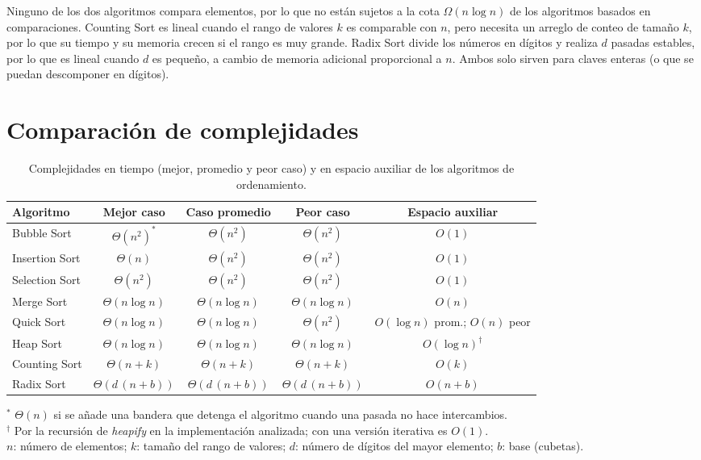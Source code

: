 \documentclass[11pt,letterpaper]{article}
\begin{document}
Ninguno de los dos algoritmos compara elementos, por lo que no están sujetos a la cota $\Omega(n \log n)$ de los algoritmos basados en comparaciones. Counting Sort es lineal cuando el rango de valores $k$ es comparable con $n$, pero necesita un arreglo de conteo de tamaño $k$, por lo que su tiempo y su memoria crecen si el rango es muy grande. Radix Sort divide los números en dígitos y realiza $d$ pasadas estables, por lo que es lineal cuando $d$ es pequeño, a cambio de memoria adicional proporcional a $n$. Ambos solo sirven para claves enteras (o que se puedan descomponer en dígitos).

\clearpage

\section{Comparación de complejidades}

\begin{table}[htbp]
  \centering
  \caption{Complejidades en tiempo (mejor, promedio y peor caso) y en espacio auxiliar de los algoritmos de ordenamiento.}
  \begin{tabular}{lcccc}
    \toprule
    \textbf{Algoritmo} & \textbf{Mejor caso} & \textbf{Caso promedio} & \textbf{Peor caso} & \textbf{Espacio auxiliar} \\
    \midrule
    Bubble Sort    & $\Theta(n^2)^{*}$     & $\Theta(n^2)$         & $\Theta(n^2)$         & $O(1)$ \\
    Insertion Sort & $\Theta(n)$           & $\Theta(n^2)$         & $\Theta(n^2)$         & $O(1)$ \\
    Selection Sort & $\Theta(n^2)$         & $\Theta(n^2)$         & $\Theta(n^2)$         & $O(1)$ \\
    \midrule
    Merge Sort     & $\Theta(n \log n)$    & $\Theta(n \log n)$    & $\Theta(n \log n)$    & $O(n)$ \\
    Quick Sort     & $\Theta(n \log n)$    & $\Theta(n \log n)$    & $\Theta(n^2)$         & $O(\log n)$ prom.; $O(n)$ peor \\
    Heap Sort      & $\Theta(n \log n)$    & $\Theta(n \log n)$    & $\Theta(n \log n)$    & $O(\log n)^{\dagger}$ \\
    \midrule
    Counting Sort  & $\Theta(n + k)$       & $\Theta(n + k)$       & $\Theta(n + k)$       & $O(k)$ \\
    Radix Sort     & $\Theta(d\,(n + b))$  & $\Theta(d\,(n + b))$  & $\Theta(d\,(n + b))$  & $O(n + b)$ \\
    \bottomrule
  \end{tabular}

  \smallskip
  {\footnotesize $^{*}$ $\Theta(n)$ si se añade una bandera que detenga el algoritmo cuando una pasada no hace intercambios. \\
  $^{\dagger}$ Por la recursión de \emph{heapify} en la implementación analizada; con una versión iterativa es $O(1)$. \\
  $n$: número de elementos; $k$: tamaño del rango de valores; $d$: número de dígitos del mayor elemento; $b$: base (cubetas).}
\end{table}
\end{document}
